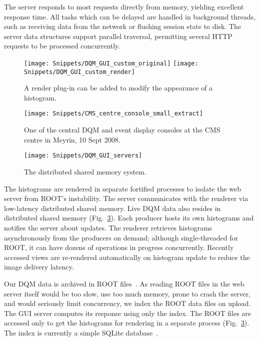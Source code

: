 \documentclass[a4paper]{jpconf}
\begin{document}
The server responds to most requests directly from memory, yielding
excellent response time.  All tasks which can be delayed are handled
in background threads, such as receiving data from the network or
flushing session state to disk.  The server data structures support
parallel traversal, permitting several HTTP requests to be processed
concurrently.

\begin{figure}[!tbp]
\begin{center}
\texttt{[image: Snippets/DQM\_GUI\_custom\_original]}\hfill
\raisebox{6em}{\LARGE\,$\Rightarrow$}\hfill
\texttt{[image: Snippets/DQM\_GUI\_custom\_render]}
\caption{\label{fig:plugin}A render plug-in can be added to modify the appearance of a histogram.}
\end{center}
\end{figure}

\begin{figure}[!tbp]
\begin{center}
\texttt{[image: Snippets/CMS\_centre\_console\_small\_extract]}
\caption{\label{fig:console}One of the central DQM and event display consoles at the CMS centre in Meyrin, 10 Sept 2008.}
\end{center}
\end{figure}

\begin{figure}[!tbp]
\begin{center}
\texttt{[image: Snippets/DQM\_GUI\_servers]}
\caption{\label{fig:shmem}The distributed shared memory system.}
\end{center}
\end{figure}

The histograms are rendered in separate fortified processes to isolate
the web server from ROOT's instability.  The server communicates with
the renderer via low-latency distributed shared memory.  Live DQM data
also resides in distributed shared memory (Fig.~\ref{fig:shmem}).
Each producer hosts its own histograms and notifies the server about
updates.  The renderer retrieves histograms asynchronously from the
producers on demand; although single-threaded for ROOT, it can have
dozens of operations in progress concurrently.  Recently accessed
views are re-rendered automatically on histogram update to reduce the
image delivery latency.

Our DQM data is archived in ROOT files~\cite{root}.  As reading ROOT
files in the web server itself would be too slow, use too much memory,
prone to crash the server, and would seriously limit concurrency, we
index the ROOT data files on upload.  The GUI server computes its
response using only the index.  The ROOT files are accessed only to
get the histograms for rendering in a separate process
(Fig.~\ref{fig:shmem}).  The index is currently a simple SQLite
database~\cite{sqlite}.
\end{document}
